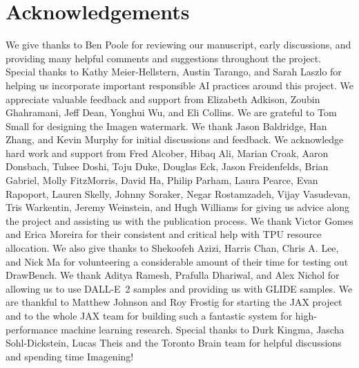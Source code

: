 \section{Acknowledgements}

We give thanks to Ben Poole for reviewing our manuscript, early discussions, and providing many helpful comments and suggestions throughout the project. Special thanks to Kathy Meier-Hellstern, Austin Tarango, and Sarah Laszlo for helping us incorporate important responsible AI practices around this project. We appreciate valuable feedback and support from Elizabeth Adkison, Zoubin Ghahramani, Jeff Dean, Yonghui Wu, and Eli Collins. We are grateful to Tom Small for designing the Imagen watermark. We thank Jason Baldridge, Han Zhang, and Kevin Murphy for initial discussions and feedback. We acknowledge hard work and support from Fred Alcober, Hibaq Ali, Marian Croak, Aaron Donsbach, Tulsee Doshi, Toju Duke, Douglas Eck, Jason Freidenfelds, Brian Gabriel, Molly FitzMorris, David Ha, Philip Parham, Laura Pearce, Evan Rapoport, Lauren Skelly, Johnny Soraker, Negar Rostamzadeh, Vijay Vasudevan, Tris Warkentin, Jeremy Weinstein, and Hugh Williams for giving us advice along the project and assisting us with the publication process. We thank Victor Gomes and Erica Moreira for their consistent and critical help with TPU resource allocation. We also give thanks to Shekoofeh Azizi, Harris Chan, Chris A. Lee, and Nick Ma for volunteering a considerable amount of their time for testing out DrawBench. We thank Aditya Ramesh, Prafulla Dhariwal, and Alex Nichol for allowing us to use DALL-E~2 samples and providing us with GLIDE samples. We are thankful to Matthew Johnson and Roy Frostig for starting the JAX project and to the whole JAX team for building such a fantastic system for high-performance machine learning research. Special thanks to Durk Kingma, Jascha Sohl-Dickstein, Lucas Theis and the Toronto Brain team for helpful discussions and spending time Imagening!
